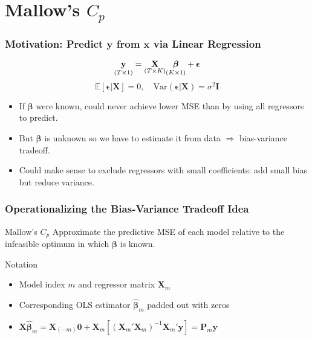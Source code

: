 \section{Mallow's $C_p$}
\begin{frame}
  \frametitle{Motivation: Predict $\mathbf{y}$ from $\mathbf{x}$ via Linear Regression}

  \[\underset{\small(T\times1)}{\textbf{y}} = \underset{(T\times K)}{\mathbf{X} }\underset{(K\times 1)}{\boldsymbol{\beta}} + \boldsymbol{\epsilon}\]
\small
\[\mathbb{E}[\boldsymbol{\epsilon}|\mathbf{X}] = 0 ,\quad
\text{Var}(\boldsymbol{\epsilon}|\mathbf{X}) = \sigma^2 \mathbf{I}\]
\normalsize

\pause

\begin{itemize}
  \item If $\boldsymbol{\beta}$ were known, could never achieve lower MSE than by using all regressors to predict.\pause
  \item But $\boldsymbol{\beta}$ is unknown so we have to estimate it from data $\Rightarrow$ bias-variance tradeoff.\pause
  \item Could make sense to exclude regressors with small coefficients: add small bias but reduce variance.
\end{itemize}
\end{frame}
\begin{frame}
  \frametitle{Operationalizing the Bias-Variance Tradeoff Idea}

  \begin{alertblock}{Mallow's $C_p$}
    Approximate the predictive MSE of each model relative to the infeasible optimum in which $\boldsymbol{\beta}$ is known. 
  \end{alertblock}

  \pause

  \begin{block}{Notation}
    \begin{itemize}
      \item Model index $m$ and regressor matrix $\mathbf{X}_m$
      \item Corresponding OLS estimator $\boldsymbol{\widehat{\beta}}_m$ padded out with zeros
      \item $\mathbf{X} \widehat{\boldsymbol{\beta}}_m = \mathbf{X}_{(-m)}\mathbf{0} + \mathbf{X}_m\left[ (\mathbf{X}_m'\mathbf{X}_m)^{-1}\mathbf{X}_m' \mathbf{y} \right] = \mathbf{P}_m \mathbf{y}$
    \end{itemize}
  \end{block}

\end{frame}
